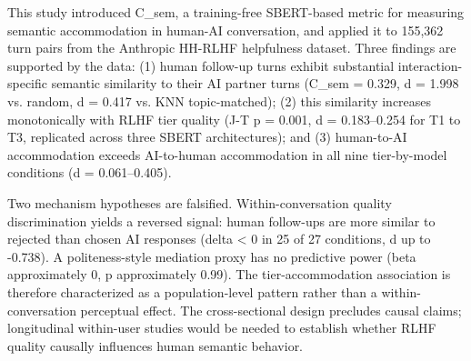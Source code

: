 
This study introduced C\_sem, a training-free SBERT-based metric for measuring semantic accommodation in human-AI conversation, and applied it to 155,362 turn pairs from the Anthropic HH-RLHF helpfulness dataset. Three findings are supported by the data: (1) human follow-up turns exhibit substantial interaction-specific semantic similarity to their AI partner turns (C\_sem = 0.329, d = 1.998 vs. random, d = 0.417 vs. KNN topic-matched); (2) this similarity increases monotonically with RLHF tier quality (J-T p = 0.001, d = 0.183--0.254 for T1 to T3, replicated across three SBERT architectures); and (3) human-to-AI accommodation exceeds AI-to-human accommodation in all nine tier-by-model conditions (d = 0.061--0.405).

Two mechanism hypotheses are falsified. Within-conversation quality discrimination yields a reversed signal: human follow-ups are more similar to rejected than chosen AI responses (delta < 0 in 25 of 27 conditions, d up to -0.738). A politeness-style mediation proxy has no predictive power (beta approximately 0, p approximately 0.99). The tier-accommodation association is therefore characterized as a population-level pattern rather than a within-conversation perceptual effect. The cross-sectional design precludes causal claims; longitudinal within-user studies would be needed to establish whether RLHF quality causally influences human semantic behavior.
